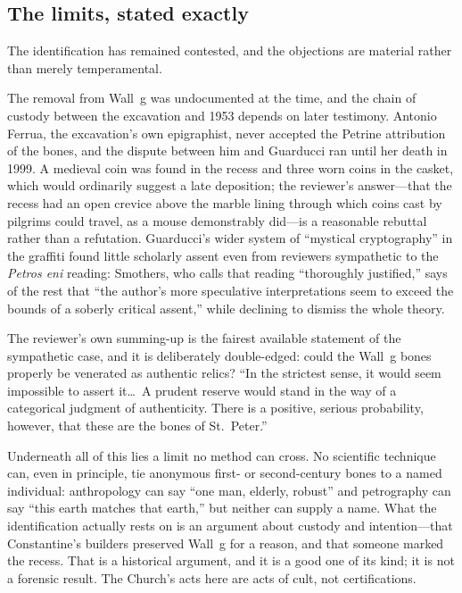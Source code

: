 \subsection{The limits, stated exactly}

The identification has remained contested, and the objections are material
rather than merely temperamental.

The removal from Wall~g was undocumented at the time, and the chain of
custody between the excavation and 1953 depends on later testimony. Antonio
Ferrua, the excavation's own epigraphist, never accepted the Petrine
attribution of the bones, and the dispute between him and Guarducci ran until
her death in 1999. A medieval coin was found in the recess and three worn
coins in the casket, which would ordinarily suggest a late deposition; the
reviewer's answer---that the recess had an open crevice above the marble
lining through which coins cast by pilgrims could travel, as a mouse
demonstrably did---is a reasonable rebuttal rather than a refutation.
Guarducci's wider system of ``mystical cryptography'' in the graffiti found
little scholarly assent even from reviewers sympathetic to the
\textit{Petros eni} reading: Smothers, who calls that reading ``thoroughly
justified,'' says of the rest that ``the author's more speculative
interpretations seem to exceed the bounds of a soberly critical assent,''
while declining to dismiss the whole theory.

The reviewer's own summing-up is the fairest available statement of the
sympathetic case, and it is deliberately double-edged: could the Wall~g bones
properly be venerated as authentic relics? ``In the strictest sense, it would
seem impossible to assert it\ldots\ A prudent reserve would stand in the way
of a categorical judgment of authenticity. There is a positive, serious
probability, however, that these are the bones of St.~Peter.''

Underneath all of this lies a limit no method can cross. No scientific
technique can, even in principle, tie anonymous first- or second-century bones
to a named individual: anthropology can say ``one man, elderly, robust'' and
petrography can say ``this earth matches that earth,'' but neither can supply
a name. What the identification actually rests on is an argument about
custody and intention---that Constantine's builders preserved Wall~g for a
reason, and that someone marked the recess. That is a historical argument,
and it is a good one of its kind; it is not a forensic result. The Church's
acts here are acts of cult, not certifications.

